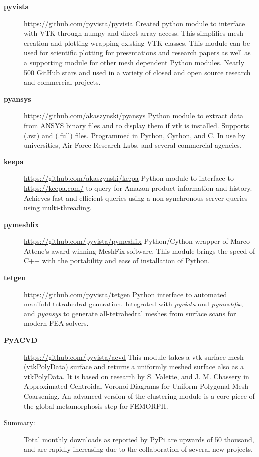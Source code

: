 \documentclass[letterpaper,11pt]{article}
\begin{document}
\begin{description}
\item[\textbf{pyvista}] \url{https://github.com/pyvista/pyvista} \newline
  Created python module to interface with VTK through numpy and direct array access. This simplifies mesh creation and plotting wrapping existing VTK classes.  This module can be used for scientific plotting for presentations and research papers as well as a supporting module for other mesh dependent Python modules.  Nearly 500 GitHub stars and used in a variety of closed and open source research and commercial projects.
\item[\textbf{pyansys}] \url{https://github.com/akaszynski/pyansys} \newline
  Python module to extract data from ANSYS binary files and to display them if vtk is installed.  Supports (.rst) and (.full) files.  Programmed in Python, Cython, and C.  In use by universities, Air Force Research Labs, and several commercial agencies.
\item[\textbf{keepa}] \url{https://github.com/akaszynski/keepa} \newline
Python module to interface to \url{https://keepa.com/} to query for Amazon product information and history.  Achieves fast and efficient queries using a non-synchronous server queries using multi-threading.
\item[\textbf{pymeshfix}] \url{https://github.com/pyvista/pymeshfix} \newline
Python/Cython wrapper of Marco Attene's award-winning MeshFix software. This module brings the speed of C++ with the portability and ease of installation of Python.
\item[\textbf{tetgen}] \url{https://github.com/pyvista/tetgen} \newline
Python interface to automated manifold tetrahedral generation.  Integrated with \textit{pyvista} and \textit{pymeshfix}, and \textit{pyansys} to generate all-tetrahedral meshes from surface scans for modern FEA solvers.
\item[\textbf{PyACVD}] \url{https://github.com/pyvista/acvd} \newline
  This module takes a vtk surface mesh (vtkPolyData) surface and returns a uniformly meshed surface also as a vtkPolyData.  It is based on research by S. Valette, and J. M. Chassery in Approximated Centroidal Voronoi Diagrams for Uniform Polygonal Mesh Coarsening.  An advanced version of the clustering module is a core piece of the global metamorphosis step for FEMORPH.

\item[Summary:] \newline
  Total monthly downloads as reported by PyPi are upwards of 50 thousand, and are rapidly increasing due to the collaboration of several new projects.
\end{description}
\end{document}
